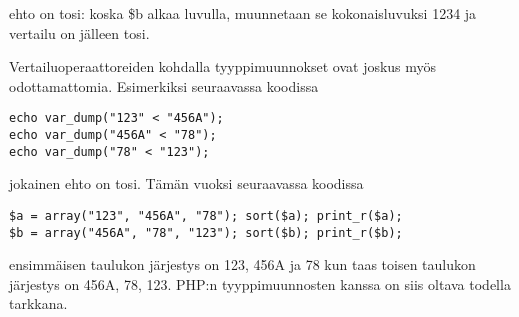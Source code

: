 ehto on tosi: koska \$b alkaa luvulla, muunnetaan se kokonaisluvuksi 1234 ja vertailu on jälleen tosi. 
\par
Vertailuoperaattoreiden kohdalla tyyppimuunnokset ovat joskus myös odottamattomia. Esimerkiksi seuraavassa koodissa~\cite{man_php_typejuggling}

\begin{lstlisting}
echo var_dump("123" < "456A");
echo var_dump("456A" < "78");
echo var_dump("78" < "123");
\end{lstlisting}

jokainen ehto on tosi. Tämän vuoksi seuraavassa koodissa~\cite{reddit_example}

\begin{lstlisting}
$a = array("123", "456A", "78"); sort($a); print_r($a);
$b = array("456A", "78", "123"); sort($b); print_r($b);
\end{lstlisting}

ensimmäisen taulukon järjestys on 123, 456A ja 78 kun taas toisen taulukon järjestys on 456A, 78, 123. PHP:n tyyppimuunnosten kanssa on siis oltava todella tarkkana.




